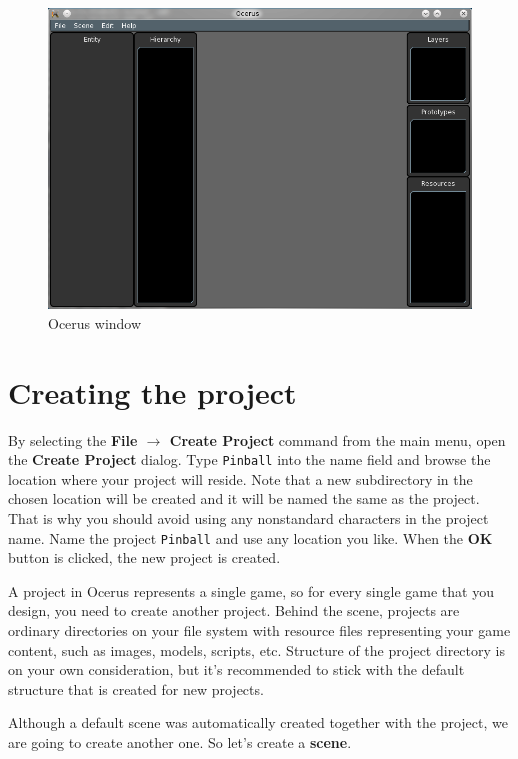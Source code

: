 \documentclass[a4paper,12pt]{article}
\begin{document}
\begin{figure}[ht]
 \begin{center}
  \includegraphics[width=\textwidth]{Initial}
 \end{center}
 \caption{Ocerus window}
 \label{fig:ocerus_initial}
\end{figure}

\section{Creating the project}
By selecting the \textbf{File $\to$ Create Project} command from the main menu, open the \textbf{Create Project} dialog. Type \texttt{Pinball} into the name field and browse the location where your project will reside. Note that a new subdirectory in the chosen location will be created and it will be named the same as the project. That is why you should avoid using any nonstandard characters in the project name. Name the project \texttt{Pinball} and use any location you like. When the \textbf{OK} button is clicked, the new project is created.

A project in Ocerus represents a single game, so for every single game that you design, you need to create another project. Behind the scene, projects are ordinary directories on your file system with resource files representing your game content, such as images, models, scripts, etc. Structure of the project directory is on your own consideration, but it's recommended to stick with the default structure that is created for new projects.

Although a default scene was automatically created together with the project, we are going to create another one. So let's create a \textbf{scene}.
\end{document}
